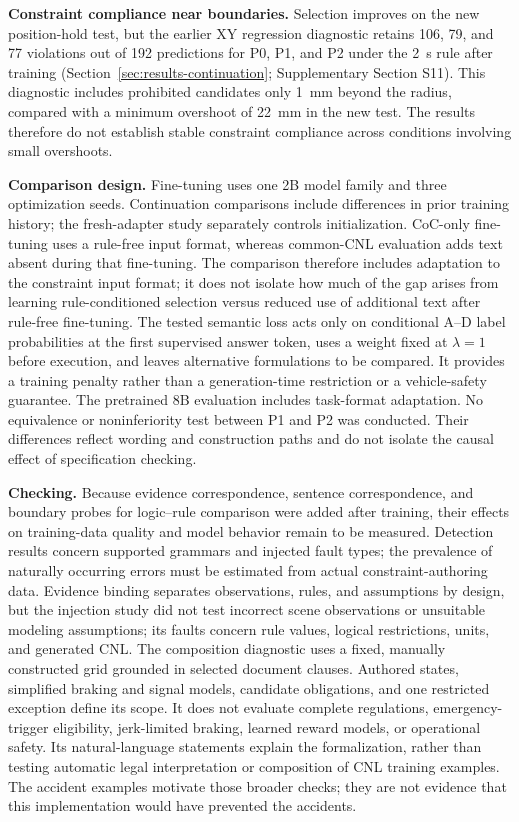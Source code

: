 \noindent\textbf{Constraint compliance near boundaries.}
Selection improves on the new position-hold test, but the earlier XY regression
diagnostic retains 106, 79, and 77 violations out of 192 predictions for P0,
P1, and P2 under the 2~s rule after training
(Section~\ref{sec:results-continuation}; Supplementary Section S11). This
diagnostic includes prohibited candidates only 1~mm beyond the radius, compared
with a minimum overshoot of 22~mm in the new test. The results therefore do
not establish stable constraint compliance across conditions involving small overshoots.

\noindent\textbf{Comparison design.}
Fine-tuning uses one 2B model family and three optimization seeds. Continuation
comparisons include differences in prior training history; the fresh-adapter
study separately controls initialization. CoC-only fine-tuning uses a rule-free
input format, whereas common-CNL evaluation adds text absent during that
fine-tuning. The comparison therefore includes adaptation to the constraint
input format; it does not isolate how much of the gap arises from learning
rule-conditioned selection versus reduced use of additional text after
rule-free fine-tuning. The tested semantic loss acts only
on conditional A--D label probabilities at the first supervised answer token,
uses a weight fixed at $\lambda=1$ before execution, and leaves alternative
formulations to be compared. It provides a training penalty rather than a
generation-time restriction or a vehicle-safety guarantee. The pretrained 8B
evaluation includes task-format adaptation.
No equivalence or noninferiority test between P1 and P2 was conducted. Their
differences reflect wording and construction paths and do not isolate the
causal effect of specification checking.

\noindent\textbf{Checking.}
Because evidence correspondence, sentence correspondence, and boundary probes
for logic--rule comparison were added after training, their effects on training-data quality and model behavior remain to
be measured. Detection results concern supported grammars and
injected fault types; the prevalence of naturally occurring errors must be
estimated from actual constraint-authoring data. Evidence binding separates
observations, rules, and assumptions by design, but the injection study did
not test incorrect scene observations or unsuitable modeling assumptions; its
faults concern rule values, logical restrictions, units, and generated CNL.
The composition diagnostic uses a fixed, manually constructed grid grounded
in selected document clauses. Authored states, simplified braking and signal
models, candidate obligations, and one restricted exception define its scope.
It does not evaluate complete regulations, emergency-trigger eligibility,
jerk-limited braking, learned reward models, or operational safety. Its
natural-language statements explain the formalization, rather than testing
automatic legal interpretation or composition of CNL training examples. The accident examples
motivate those broader checks; they are not evidence that this implementation
would have prevented the accidents.

